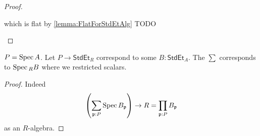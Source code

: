 \begin{proof}
\begin{itemize}
		 which is flat by \ref{lemma:FlatForStdEtAlg} TODO
	\end{itemize}
\end{proof}
\begin{rmk}
	$P = \operatorname{Spec} A$.
	Let $P \to \mathsf{StdEt}_R$ correspond to some $B : \mathsf{StdEt}_{A}$. The $\sum$ corresponds to $\operatorname{Spec} {}_R B$ where we restricted scalars.
\end{rmk}
\begin{proof}
	Indeed 
	\[
	\left(\sum_{\mathfrak{p} : P} \operatorname{Spec} B_{\mathfrak{p}} \right) \to R = \prod_{\mathfrak{p} :P} B_{\mathfrak{p}}
	\]
	as an $R$-algebra.
\end{proof}



